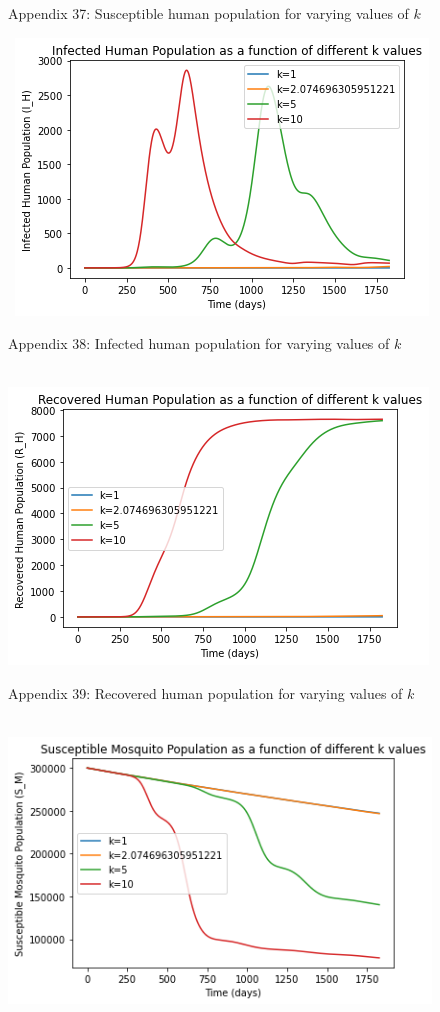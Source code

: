 \documentclass[
	12pt,				%
	oneside,			%
	a4paper,			%
	english,			%
	brazil				%
	]{abntex2}
\begin{document}
\begin{apendicesenv}
\begin{figure}[!ht]
	\caption*{Appendix 37: Susceptible human population for varying values of $k$}
\end{figure} 
\begin{figure}[!ht]
	\centering
	\hbox{\hspace{7.0em} \includegraphics[scale=0.65] {THESIS-IH_for_k_values_Correction.png}}
	\caption*{Appendix 38: Infected human population for varying values of $k$}
\end{figure}
\begin{figure}[!ht]
	\centering
	\hbox{\hspace{7.0em} \includegraphics[scale=0.65] {THESIS-RH_for_k_values.png}}
	\caption*{Appendix 39: Recovered human population for varying values of $k$}
\end{figure}
\newpage
\begin{figure}[!ht]
	\centering
	\hbox{\hspace{7.0em} \includegraphics[scale=0.65] {THESIS-SM_for_k_values.png}}

\end{figure}
\end{apendicesenv}
\end{document}
